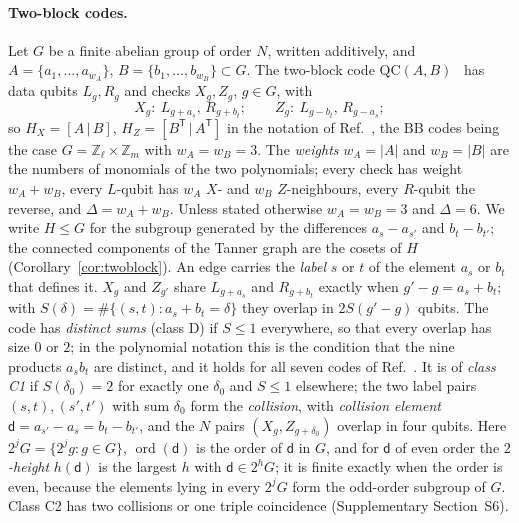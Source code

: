 \documentclass[reprint,twocolumn,superscriptaddress,nofootinbib]{revtex4-2}
\theoremstyle{plain}
\newcommand{\col}{\mathsf{d}}          %
\newcommand{\wA}{w_A}                  %
\newcommand{\wB}{w_B}
\begin{document}
\paragraph*{Two-block codes.}
Let $G$ be a finite abelian group of order $N$, written additively, and
$A=\{a_1,\dots,a_{\wA}\}$, $B=\{b_1,\dots,b_{\wB}\}\subset G$. The two-block
code $\mathrm{QC}(A,B)$~\cite{KovalevPryadko2013,PanteleevKalachev2021,
LinPryadko2024,WangLinPryadko2023} has data qubits $L_g,R_g$ and checks
$X_g,Z_g$, $g\in G$, with
\begin{equation}
X_g:\ L_{g+a_s},\,R_{g+b_t};\qquad Z_g:\ L_{g-b_t},\,R_{g-a_s};
\label{eq:twoblock}
\end{equation}
so $H_X=[A\,|\,B]$, $H_Z=[B^{\mathsf T}\,|\,A^{\mathsf T}]$ in the
notation of Ref.~\cite{Bravyi2024}, the BB codes being the case
$G=\mathbb{Z}_\ell\times\mathbb{Z}_m$ with $\wA=\wB=3$. The \emph{weights}
$\wA=|A|$ and $\wB=|B|$ are the numbers of monomials of the two
polynomials; every check has weight $\wA+\wB$, every $L$-qubit has $\wA$
$X$- and $\wB$ $Z$-neighbours, every $R$-qubit the reverse, and
$\Delta=\wA+\wB$. Unless stated otherwise $\wA=\wB=3$ and $\Delta=6$. We
write $H\le G$ for the subgroup generated by the differences $a_s-a_{s'}$
and $b_t-b_{t'}$; the connected components of the Tanner graph are the
cosets of $H$ (Corollary~\ref{cor:twoblock}). An edge carries the
\emph{label} $s$ or $t$ of the element $a_s$ or $b_t$ that defines it. $X_g$ and $Z_{g'}$ share $L_{g+a_s}$ and $R_{g+b_t}$ exactly
when $g'-g=a_s+b_t$; with $S(\delta)=\#\{(s,t):a_s+b_t=\delta\}$ they
overlap in $2S(g'-g)$ qubits. The code has \emph{distinct sums} (class D)
if $S\le1$ everywhere, so that every overlap has size $0$ or $2$; in the
polynomial notation this is the condition that the nine products $a_sb_t$
are distinct, and it holds for all seven codes of Ref.~\cite{Bravyi2024}.
It is of \emph{class C1} if $S(\delta_0)=2$ for exactly one $\delta_0$ and
$S\le1$ elsewhere; the two label pairs $(s,t),(s',t')$ with sum $\delta_0$
form the \emph{collision}, with \emph{collision element}
$\col=a_{s'}-a_s=b_t-b_{t'}$, and the $N$ pairs $(X_g,Z_{g+\delta_0})$
overlap in four qubits. Here $2^jG=\{2^jg:g\in G\}$, $\operatorname{ord}(\col)$
is the order of $\col$ in $G$, and for $\col$ of even order the
\emph{$2$-height} $h(\col)$ is the largest $h$ with $\col\in2^hG$; it is
finite exactly when the order is even, because the elements lying in every
$2^jG$ form the odd-order subgroup of $G$. Class C2 has two collisions or
one triple coincidence (Supplementary Section~S6).
\end{document}
